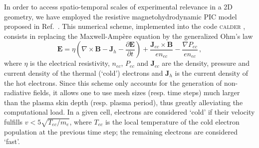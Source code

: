 \documentclass[aps,twocolumn,showpacs,superscriptaddress]{revtex4}
\begin{document}
In order to access spatio-temporal scales of experimental relevance in a 2D geometry, we have employed the resistive magnetohydrodynamic PIC model proposed in
\mbox{Ref.~\cite{JCP_Cohen_2010}}. This numerical scheme, implemented into the code \textsc{calder} \cite{NF_Lefebvre_2003}, consists in replacing the Maxwell-Amp\`ere equation
by the generalized Ohm's law
\begin{equation} \label{eq:PICMHD}
  \mathbf{E}=\eta \left(\nabla \times \mathbf{B}-\mathbf{J}_{h}-\frac{\partial \mathbf{E}}{\partial t}\right)+\frac{\mathbf{J}_{ec}\times \mathbf{B}}{en_{ec}}
  -\frac{\nabla P_{ec}}{en_{ec}} \,,
\end{equation}
where $\eta$ is the electrical resistivity, $n_{ec}$, $P_{ec}$ and $\mathbf{J}_{ec}$ are the density, pressure and current density of the thermal (`cold') electrons and $\mathbf{J}_h$ is the current density of the hot electrons. Since this scheme only accounts for the generation of non-radiative fields, it allows one to use mesh sizes (resp. time steps) much larger than the plasma skin depth (resp. plasma period), thus greatly alleviating the computational load. In a given cell, electrons are considered `cold' if their velocity fulfills $v<5\sqrt{T_{ec}/m_e}$, where $T_{ec}$ is the local temperature of the cold electron population
at the previous time step; the remaining electrons are considered `fast'.
\end{document}
